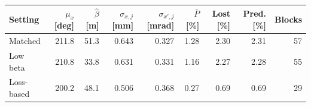 \begin{tabular}{lrrrrrrrr}\toprule
Setting & $\mu_x$ [deg] & $\hat\beta$ [m] & $\sigma_{x,j}$ [mm] & $\sigma_{x',j}$ [mrad] & $\bar P$ [\%] & Lost [\%] & Pred. [\%] & Blocks \\\midrule
Matched & 211.8 & 51.3 & 0.643 & 0.327 & 1.28 & 2.30 & 2.31 & 57 \\
Low beta & 210.8 & 33.8 & 0.631 & 0.331 & 1.16 & 2.27 & 2.28 & 55 \\
Loss-based & 200.2 & 48.1 & 0.506 & 0.368 & 0.27 & 0.69 & 0.69 & 29 \\
\bottomrule\end{tabular}

